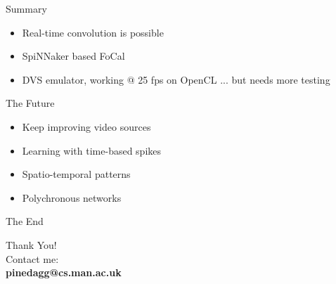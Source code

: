 \documentclass[17pt,mathserif]{beamer}
\begin{document}
    \begin{frame}{Summary}
        \vspace*{-3em}
        \begin{itemize}
          \item Real-time convolution is possible
          \item SpiNNaker based FoCal
          \item DVS emulator, working @ 25 fps on OpenCL ... but needs more testing
        \end{itemize}
    \end{frame}

    \begin{frame}{The Future}
      \vspace*{-3em}
      \begin{itemize}
        \item Keep improving video sources 
        \item Learning with time-based spikes
        \item Spatio-temporal patterns
        \item Polychronous networks
      \end{itemize}
    \end{frame}

   \begin{frame}{The End}
    \begin{center}
        \vspace*{-3em}
        {\Large Thank You!}\\
        \vspace*{0.5em}
        Contact me:\\[1em]
        {\Large \textbf{pinedagg@cs.man.ac.uk}}\\
    \end{center}
  \end{frame}
        
\end{document}
